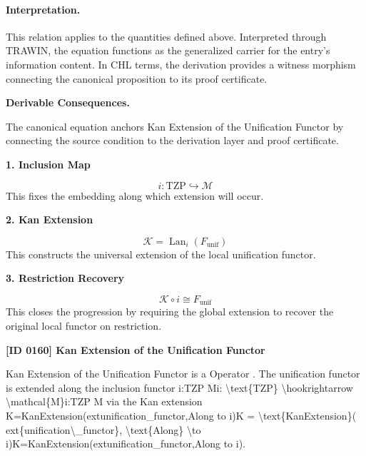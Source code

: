 \paragraph{Interpretation.}
This relation applies to the quantities defined above. Interpreted through TRAWIN, the equation functions as the generalized carrier for the entry’s information content. In CHL terms, the derivation provides a witness morphism connecting the canonical proposition to its proof certificate.

\par\vspace{0.35em}
\noindent\textbf{Derivable Consequences.}\quad
\begingroup
\footnotesize
\raggedright
The canonical equation anchors Kan Extension of the Unification Functor by connecting the source condition to the derivation layer and proof certificate.
\par\endgroup

\noindent\textbf{1. Inclusion Map}\par
\[
i:\mathrm{TZP}\hookrightarrow \mathcal{M}
\]
\noindent This fixes the embedding along which extension will occur.\par
\noindent\textbf{2. Kan Extension}\par
\[
\mathcal{K}
=
\operatorname{Lan}_{i}\!\left(F_{\mathrm{unif}}\right)
\]
\noindent This constructs the universal extension of the local unification functor.\par
\noindent\textbf{3. Restriction Recovery}\par
\[
\mathcal{K}\circ i\cong F_{\mathrm{unif}}
\]
\noindent This closes the progression by requiring the global extension to recover the original local functor on restriction.\par

\clearpage
\noindent\textbf{[ID 0160] Kan Extension of the Unification Functor}\par
\vspace{0.35em}
\begingroup\small
{}
Kan Extension of the Unification Functor is a Operator  . The unification functor is extended along the inclusion functor i:TZP Mi: \textbackslash{}text\{TZP\} \textbackslash{}hookrightarrow \textbackslash{}mathcal\{M\}i:TZP M via the Kan extension K=KanExtension(extunification\_functor,Along to i)K = \textbackslash{}text\{KanExtension\}( ext\{unification\textbackslash{}\_functor\}, \textbackslash{}text\{Along\} \textbackslash{}to i)K=KanExtension(extunification\_functor,Along to i).

